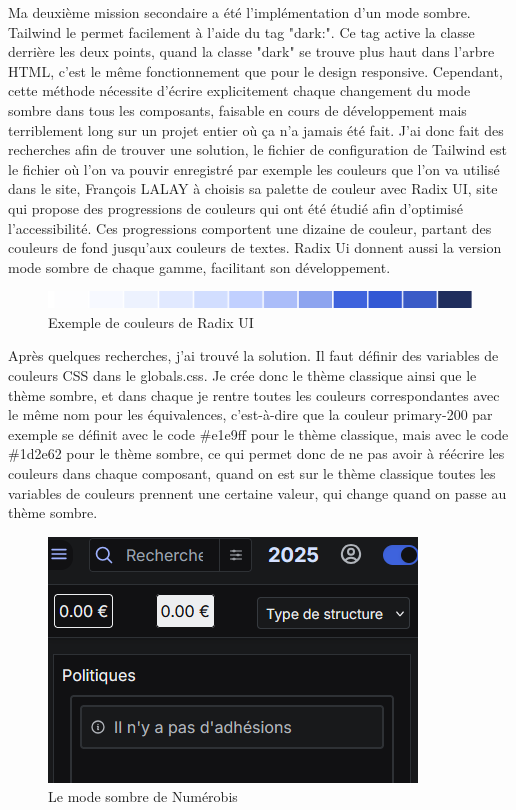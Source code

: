 \documentclass[a4paper,12pt]{report}
\begin{document}
\vspace{1em}

Ma deuxième mission secondaire a été l'implémentation d'un mode sombre. Tailwind le permet facilement à l'aide du tag "dark:". Ce tag active la classe derrière les deux points, quand la classe "dark" se trouve plus haut dans l'arbre HTML, c'est le même fonctionnement que pour le design responsive. Cependant, cette méthode nécessite d'écrire explicitement chaque changement du mode sombre dans tous les composants, faisable en cours de développement mais terriblement long sur un projet entier où ça n'a jamais été fait. J'ai donc fait des recherches afin de trouver une solution, le fichier de configuration de Tailwind est le fichier où l'on va pouvir enregistré par exemple les couleurs que l'on va utilisé dans le site, François LALAY à choisis sa palette de couleur avec Radix UI, site qui propose des progressions de couleurs qui ont été étudié afin d'optimisé l'accessibilité. Ces progressions comportent une dizaine de couleur, partant des couleurs de fond jusqu'aux couleurs de textes. Radix Ui donnent aussi la version mode sombre de chaque gamme, facilitant son développement.

\begin{figure}[H]
    \centering
    \includegraphics[scale=0.4]{colorRadixUi.png}
    \caption{Exemple de couleurs de Radix UI}
    \label{fig:radix-colors}
\end{figure}

Après quelques recherches, j'ai trouvé la solution. Il faut définir des variables de couleurs CSS dans le globals.css. Je crée donc le thème classique ainsi que le thème sombre, et dans chaque je rentre toutes les couleurs correspondantes avec le même nom pour les équivalences, c'est-à-dire que la couleur primary-200 par exemple se définit avec le code \#e1e9ff pour le thème classique, mais avec le code \#1d2e62 pour le thème sombre, ce qui permet donc de ne pas avoir à réécrire les couleurs dans chaque composant, quand on est sur le thème classique toutes les variables de couleurs prennent une certaine valeur, qui change quand on passe au thème sombre.

\begin{figure}[H]
    \centering
    \includegraphics[scale=0.5]{exempleDarkmode.png}
    \caption{Le mode sombre de Numérobis}
    \label{fig:dark-mode}
\end{figure}
\end{document}
